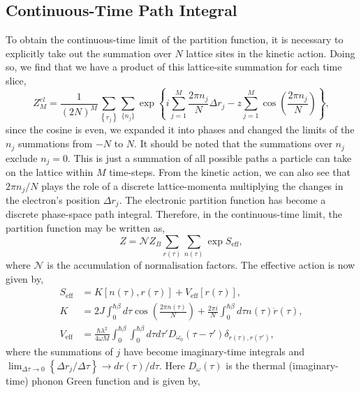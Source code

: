 \subsection{Continuous-Time Path Integral}
\label{subsec:3-2-2}

To obtain the continuous-time limit of the partition function, it is necessary to explicitly take out the summation over $N$ lattice sites in the kinetic action. Doing so, we find that we have a product of this lattice-site summation for each time slice,
\begin{equation}
    Z^{el}_M = \frac{1}{(2N)^M} \sum_{\left\{r_j\right\}} \sum_{\{n_j\}} \exp\left\{i \sum_{j=1}^M \frac{2 \pi n_j}{N} \Delta r_j - z \sum_{j=1}^M \cos(\frac{2 \pi n_j}{N})\right\} ,
\end{equation}
since the cosine is even, we expanded it into phases and changed the limits of the $n_j$ summations from $-N$ to $N$. It should be noted that the summations over $n_j$ exclude $n_j = 0$. This is just a summation of all possible paths a particle can take on the lattice within $M$ time-steps. From the kinetic action, we can also see that $2\pi n_j / N$ plays the role of a discrete lattice-momenta multiplying the changes in the electron's position $\Delta r_j$. The electronic partition function has become a discrete phase-space path integral. Therefore, in the continuous-time limit, the partition function may be written as,
\begin{equation}
    Z = \mathcal{N} Z_B \sum_{r(\tau)} \sum_{n(\tau)} \exp{S_{\text{eff}}} ,
\end{equation}
where $\mathcal{N}$ is the accumulation of normalisation factors. The effective action is now given by,
\begin{equation}
    \begin{aligned}
        S_{\text{eff}} &= K[n(\tau), r(\tau)] + V_{\text{eff}}[r(\tau)] , \\
        K &= 2J \int_0^{\hbar\beta} d\tau \cos{\left(\frac{2\pi n(\tau)}{N}\right)} + \frac{2\pi i}{N} \int_0^{\hbar\beta} d\tau n(\tau) \Dot{r}(\tau) , \\
        V_{\text{eff}} &= \frac{\hbar \lambda^2}{4 \omega M} \int_0^{\hbar\beta} \int_0^{\hbar\beta} d\tau d\tau' D_{\omega_0}(\tau - \tau') \delta_{r(\tau), r(\tau')} ,
    \end{aligned}
\end{equation}
where the summations of $j$ have become imaginary-time integrals and $\lim_{\Delta\tau \to 0} \left\{\Delta r_j / \Delta \tau\right\} \rightarrow d r(\tau) / d\tau$. Here $D_{\omega}(\tau)$ is the thermal (imaginary-time) phonon Green function  and is given by,
